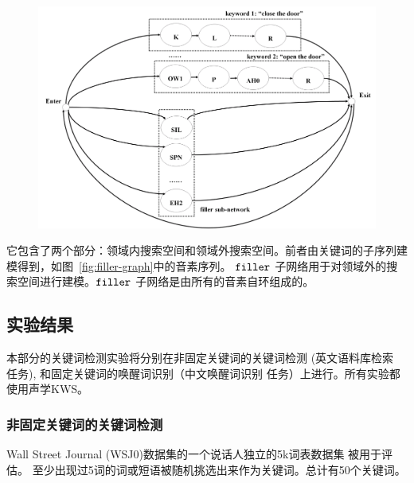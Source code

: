 \begin{figure}[!htp]
  \centering
    \captionstyle{\centering}
    \includegraphics[width=\textwidth]{figure/filler-graph.png}
\end{figure}


它包含了两个部分：领域内搜索空间和领域外搜索空间。前者由关键词的子序列建模得到，如图~\ref{fig:filler-graph}中的音素序列。 $\tt filler$ 子网络用于对领域外的搜索空间进行建模。$\tt filler$ 子网络是由所有的音素自环组成的。


\subsection{实验结果}
\label{chap:kws-exp}


本部分的关键词检测实验将分别在非固定关键词的关键词检测 (英文语料库检索 任务), 和固定关键词的唤醒词识别（中文唤醒词识别 任务）上进行。所有实验都使用声学KWS。

\subsubsection{非固定关键词的关键词检测}
\label{Sec:exp-sp-docu-detri}

Wall Street Journal (WSJ0)数据集的一个说话人独立的5k词表数据集 \cite{garofalo1993continous} 被用于评估。 至少出现过5词的词或短语被随机挑选出来作为关键词。总计有50个关键词。

